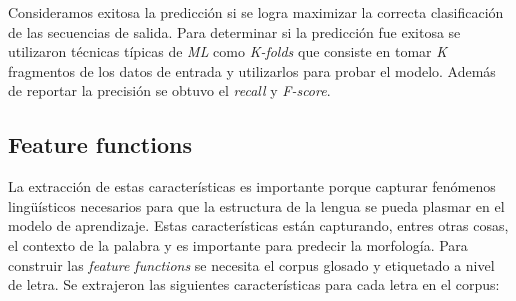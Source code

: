 \documentclass[letterpaper,12pt,oneside]{scrbook}
\theoremstyle{definition}
\begin{document}
	

	Consideramos exitosa la predicción si se logra maximizar la correcta clasificación de las secuencias de salida. Para determinar si la predicción fue exitosa se utilizaron técnicas típicas de \textit{ML} como \textit{K-folds} que consiste en tomar \textit{K} fragmentos de los datos de entrada y utilizarlos para probar el modelo. Además de reportar la precisión se obtuvo el \textit{recall} y \textit{F-score}.

	
	\subsection{Feature functions} \label{subsec:feature}

	
	La extracción de estas características es importante porque capturar fenómenos lingüísticos necesarios para que la estructura de la lengua se pueda plasmar en el modelo de aprendizaje. Estas características están capturando, entres otras cosas, el contexto de la palabra y es importante para predecir la morfología. Para construir las \textit{feature functions} se necesita el corpus glosado y etiquetado a nivel de letra. Se extrajeron las siguientes características para cada letra en el corpus:

	
	
\end{document}
